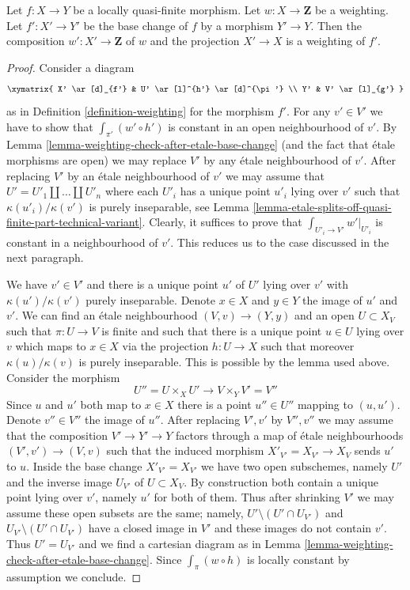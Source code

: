 \begin{lemma}
\label{lemma-weighting-base-change}
Let $f : X \to Y$ be a locally quasi-finite morphism.
Let $w : X \to \mathbf{Z}$ be a weighting. Let $f' : X' \to Y'$
be the base change of $f$ by a morphism $Y' \to Y$. Then the
composition $w' : X' \to \mathbf{Z}$ of $w$ and the projection $X' \to X$
is a weighting of $f'$.
\end{lemma}

\begin{proof}
Consider a diagram
$$
\xymatrix{
X' \ar[d]_{f'} & U' \ar[l]^{h'} \ar[d]^{\pi'} \\
Y' & V' \ar[l]_{g'}
}
$$
as in Definition \ref{definition-weighting} for the morphism $f'$.
For any $v' \in V'$ we have to show that $\int_{\pi'} (w' \circ h')$ is
constant in an open neighbourhood of $v'$. By
Lemma \ref{lemma-weighting-check-after-etale-base-change}
(and the fact that \'etale morphisms are open)
we may replace $V'$ by any \'etale neighbourhood of $v'$.
After replacing $V'$ by an \'etale neighbourhood of $v'$
we may assume that $U' = U'_1 \amalg \ldots \amalg U'_n$
where each $U'_i$ has a unique point $u'_i$ lying over $v'$
such that $\kappa(u'_i)/\kappa(v')$ is purely inseparable,
see Lemma \ref{lemma-etale-splits-off-quasi-finite-part-technical-variant}.
Clearly, it suffices to prove that $\int_{U'_i \to V'} w'|_{U'_i}$
is constant in a neighbourhood of $v'$.
This reduces us to the case discussed in the next paragraph.

\medskip\noindent
We have $v' \in V'$ and there is a unique point $u'$ of $U'$
lying over $v'$ with $\kappa(u')/\kappa(v')$ purely inseparable.
Denote $x \in X$ and $y \in Y$ the image of $u'$ and $v'$.
We can find an \'etale neighbourhood $(V, v) \to (Y, y)$
and an open $U \subset X_V$ such that $\pi : U \to V$ is finite
and such that there is a unique point $u \in U$ lying over $v$
which maps to $x \in X$ via the projection $h : U \to X$
such that moreover $\kappa(u)/\kappa(v)$ is
purely inseparable. This is possible by the lemma used above.
Consider the morphism
$$
U'' = U \times_X U' \longrightarrow V \times_Y V' = V''
$$
Since $u$ and $u'$ both map to $x \in X$ there is a point
$u'' \in U''$ mapping to $(u, u')$. Denote $v'' \in V''$
the image of $u''$. After replacing $V', v'$ by $V'', v''$ 
we may assume that the composition $V' \to Y' \to Y$ factors
through a map of \'etale neighbourhoods $(V', v') \to (V, v)$
such that the induced morphism $X'_{V'} = X_{V'} \to X_V$ sends
$u'$ to $u$. Inside the base change $X'_{V'} = X_{V'}$ we have
two open subschemes, namely $U'$ and the inverse image $U_{V'}$ of
$U \subset X_V$. By construction both contain a unique point lying
over $v'$, namely $u'$ for both of them.
Thus after shrinking $V'$ we may assume these open subsets
are the same; namely, $U' \setminus (U' \cap U_{V'})$ and
$U_{V'} \setminus (U' \cap U_{V'})$ have
a closed image in $V'$ and these images do not contain $v'$.
Thus $U' = U_{V'}$ and we find a cartesian diagram as in
Lemma \ref{lemma-weighting-check-after-etale-base-change}.
Since $\int_\pi (w \circ h)$ is locally constant
by assumption we conclude.
\end{proof}